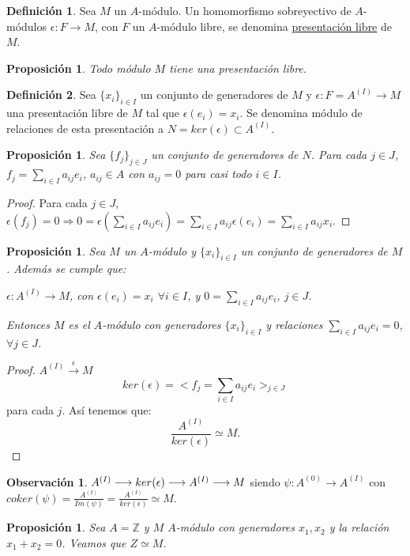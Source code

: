 \documentclass{article}
\theoremstyle{theorem-style}  %
\newtheorem{proposition}[theorem]{Proposición}
\theoremstyle{definition}
\newtheorem{definition}{Definición}[section]
\newtheorem*{observation}{Observación} %
\theoremstyle{example-style}
\begin{document}
\begin{definition}
	Sea $M$ un $A$-módulo. Un homomorfismo sobreyectivo de $A$-módulos $\epsilon : F \longrightarrow M$, con $F$ un $A$-módulo libre, se denomina \underline{presentación libre} de $M$. 
\end{definition}
\begin{proposition}
	Todo módulo $M$ tiene una presentación libre.
\end{proposition}
\begin{definition}
	Sea $\{x_i\}_{i\in I}$ un conjunto de generadores de $M$ y $\epsilon : F = A^{(I)} \longrightarrow M$ una presentación libre de $M$ tal que $\epsilon (e_i) = x_i$. Se denomina módulo de relaciones de esta presentación a $N = ker(\epsilon) \subset A^{(I)}$.
\end{definition}
\begin{proposition}
	Sea $\{f_j\}_{j\in J}$ un conjunto de generadores de $N$. Para cada $j\in J$, $f_j = \sum_{i\in I} a_{ij}e_i$, $a_{ij}\in A$ con $a_{ij} = 0$ para casi todo $i\in I$.
\end{proposition}
\begin{proof}
	Para cada $j\in J$, $\epsilon (f_j) = 0 \Rightarrow 0 = \epsilon (\sum_{i\in I} a_{ij}e_i) = \sum_{i\in I} a_{ij} \epsilon (e_i) = \sum_{i\in I} a_{ij} x_i$. 
\end{proof}
\begin{proposition}
	Sea $M$ un $A$-módulo y $\{x_i\}_{i\in I}$ un conjunto de generadores de $M$. Además se cumple que:
	\begin{center}
		$\epsilon : A^{(I)} \longrightarrow M$, con $\epsilon (e_i) = x_i$ $\forall i\in I$, y $0 = \sum_{i\in I} a_{ij}e_i$, $j\in J$.
	\end{center}
	Entonces $M$ es el $A$-módulo con generadores $\{x_i\}_{i\in I}$ y relaciones $\sum_{i\in I} a_{ij}e_i = 0$, $\forall j\in J$.
\end{proposition}
\begin{proof}
	$A^{(I)} \stackrel{\epsilon}{\longrightarrow} M$
	\[ker(\epsilon) = <f_j = \sum_{i\in I} a_{ij}e_i>_{j\in J}\]
	para cada $j$. Así tenemos que:
	\[\frac{A^{(I)}}{ker(\epsilon)}\simeq M.\]
\end{proof}
\begin{observation}
	$A^{(I)} \longrightarrow ker(\epsilon) \longrightarrow A^{(I)} \longrightarrow M \\$
	siendo $\psi: A^{(0)} \longrightarrow A^{(I)}$ con $coker(\psi) = \frac{A^{(I)}}{Im(\psi)} = \frac{A^{(I)}}{ker(\epsilon)} \simeq M$.
\end{observation}
\begin{proposition}
	Sea $A=\mathbb{Z}$ y $M$ $A$-módulo con generadores $x_1,x_2$ y la relación $x_1+x_2=0$. Veamos que $Z\simeq M$.
\end{proposition}
\end{document}
